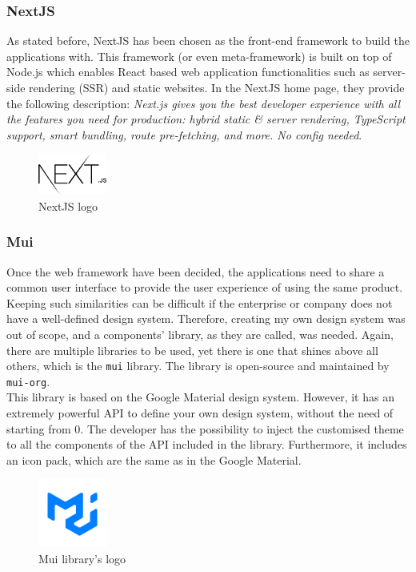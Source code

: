 \documentclass[a4paper, 12pt, oneside]{book}
\begin{document}
\subsubsection{NextJS}
As stated before, NextJS has been chosen as the front-end framework to build the applications with. This framework (or even meta-framework) is built on top of Node.js which enables React based web application functionalities such as server-side rendering (SSR) and static websites. In the NextJS home page, they provide the following description: \emph{Next.js gives you the best developer experience with all the features you need for production: hybrid static \& server rendering, TypeScript support, smart bundling, route pre-fetching, and more. No config needed}.
\\
\begin{figure}[h!]
	\centering
	\includegraphics[width=0.2\textwidth]{assets/next-logo.png}
	\caption{NextJS logo}
\end{figure}
\subsubsection{Mui}
Once the web framework have been decided, the applications need to share a common user interface to provide the user experience of using the same product. Keeping such similarities can be difficult if the enterprise or company does not have a well-defined design system. Therefore, creating my own design system was out of scope, and a components' library, as they are called, was needed. Again, there are multiple libraries to be used, yet there is one that shines above all others, which is the \texttt{mui} library. The library is open-source and maintained by \texttt{mui-org}.
\\[8pt]
This library is based on the Google Material design system. However, it has an extremely powerful API to define your own design system, without the need of starting from 0. The developer has the possibility to inject the customised theme to all the components of the API included in the library. Furthermore, it includes an icon pack, which are the same as in the Google Material.
\\
\begin{figure}[h!]
	\centering
	\includegraphics[width=0.2\textwidth]{assets/mui-logo.png}
	\caption{Mui library's logo}
\end{figure}
\end{document}
